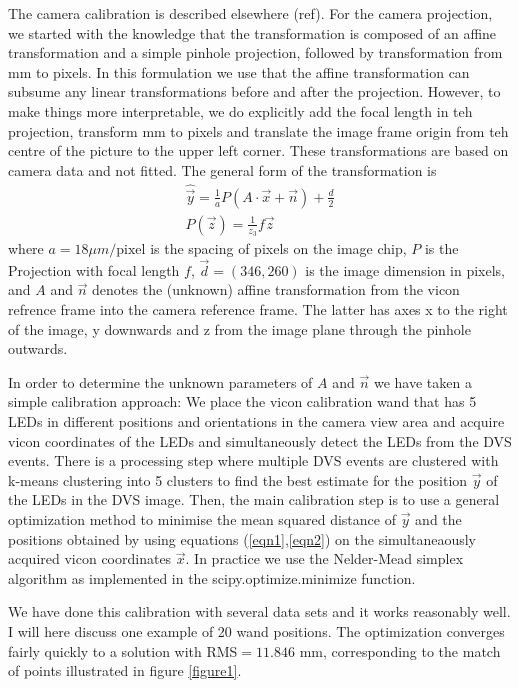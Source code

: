 \documentclass{article}
\begin{document}
The camera calibration is described elsewhere (ref).
For the camera projection, we started with the knowledge that the transformation is composed of an affine transformation and a simple pinhole projection, followed by transformation from mm to pixels. In this formulation we use that the affine transformation can subsume any linear transformations before and after the projection. However, to make things more interpretable, we do explicitly add the focal length in teh projection, transform mm to pixels and translate the image frame origin from teh centre of the picture to the upper left corner. These transformations are based on camera data and not fitted.
The general form of the transformation is
\begin{align}
  \hat{\vec{y}} = \frac{1}{a} P(A\cdot \vec{x} + \vec{n}) + \frac{d}{2} \\
  P(\vec{z})= \frac{1}{z_3}f \vec{z}  
\end{align}
where $a= 18 \mu m/\text{pixel}$ is the spacing of pixels on the image chip, $P$ is the Projection with focal length $f$, $\vec{d}= (346, 260)$ is the image dimension in pixels, and $A$ and $\vec{n}$ denotes the (unknown) affine transformation from the vicon refrence frame into the camera reference frame. The latter has axes x to the right of the image, y downwards and z from the image plane through the pinhole outwards.

In order to determine the unknown parameters of $A$ and $\vec{n}$ we have taken a simple calibration approach: We place the vicon calibration wand that has 5 LEDs in different positions and orientations in the camera view area and acquire vicon coordinates of the LEDs and simultaneously detect the LEDs from the DVS events. There is a processing step where multiple DVS events are clustered with k-means clustering into 5 clusters to find the best estimate for the position $\vec{y}$ of the LEDs in the DVS image. Then, the main calibration step is to use a general optimization method to minimise the mean squared distance of $\vec{y}$ and the positions obtained by using equations (\ref{eqn1},\ref{eqn2}) on the simultaneaously acquired vicon coordinates $\vec{x}$. In practice we use the Nelder-Mead simplex algorithm as implemented in the scipy.optimize.minimize function.

We have done this calibration with several data sets and it works reasonably well. I will here discuss one example of 20 wand positions. The optimization converges fairly quickly to a solution with RMS$= 11.846$ mm, corresponding to the match of points illustrated in figure \ref{figure1}.
\end{document}

